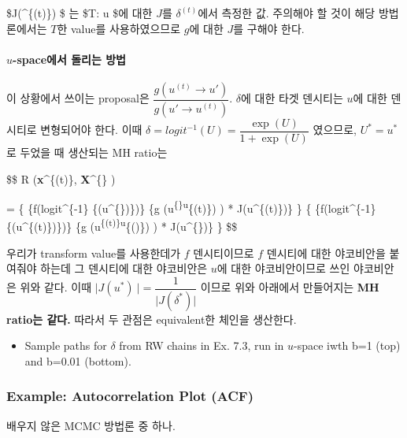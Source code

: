 \documentclass[
]{book}
\providecommand{\tightlist}{%
  \setlength{\itemsep}{0pt}\setlength{\parskip}{0pt}}
\begin{document}
\$\lvert J(\delta\^{}\{(t)\}) \rvert \$ 는 \$T: \delta \rightarrow u \$에 대한 \(J\)를 \(\delta^{(t)}\)에서 측정한 값. 주의해야 할 것이 해당 방법론에서는 \(T\)한 value를 사용하였으므로 \(g\)에 대한 \(J\)를 구해야 한다.

\hypertarget{u-spaceuxc5d0uxc11c-uxb3ccuxb9acuxb294-uxbc29uxbc95}{%
\paragraph{\texorpdfstring{\(u\)-space에서 돌리는 방법}{u-space에서 돌리는 방법}}\label{u-spaceuxc5d0uxc11c-uxb3ccuxb9acuxb294-uxbc29uxbc95}}

이 상황에서 쓰이는 proposal은 \(\dfrac {g(u^{(t)} \rightarrow u')} {g(u' \rightarrow u^{(t)})}\). \(\delta\)에 대한 타겟 덴시티는 \(u\)에 대한 덴시티로 변형되어야 한다. 이때 \(\delta = logit^{-1}(U) = \dfrac{\exp(U)}{1+\exp(U)}\) 였으므로, \(U^{\ast} = u^{\ast}\) 로 두었을 때 생산되는 MH ratio는

\$\$
R (\textbf {x}\^{}\{(t)\}, \textbf X\^{}\{\ast\} )

=\dfrac 
\{\dfrac
\{f(logit\^{}\{-1\} \{(u\^{}\{\ast\})\})\}
\{g \left(u\textsuperscript{\{\ast\}\textbar u}\{(t)\}) \right) * \left\textbar{} J(u\^{}\{(t)\})\right\textbar\}
\}
\{\dfrac
\{f(logit\^{}\{-1\} \{(u\^{}\{(t)\})\})\}
\{g \left(u\textsuperscript{\{(t)\}\textbar u}\{(\ast)\}) \right) * \left\textbar{} J(u\^{}\{\ast\})\right\textbar\}
\}
\$\$

우리가 transform value를 사용한데가 \(f\) 덴시티이므로 \(f\) 덴시티에 대한 야코비안을 붙여줘야 하는데 그 덴시티에 대한 야코비안은 \(u\)에 대한 야코비안이므로 쓰인 야코비안은 위와 같다. 이때 \(\lvert J(u^{\ast})\ \rvert = \dfrac {1} {\lvert J(\delta^{\ast}) \rvert}\) 이므로 위와 아래에서 만들어지는 \textbf{MH ratio는 같다.} 따라서 두 관점은 equivalent한 체인을 생산한다.

\begin{itemize}
\tightlist
\item
  Sample paths for \(\delta\) from RW chains in Ex. 7.3, run in \(u\)-space iwth b=1 (top) and b=0.01 (bottom).
\end{itemize}

\hypertarget{example-autocorrelation-plot-acf}{%
\subsubsection{Example: Autocorrelation Plot (ACF)}\label{example-autocorrelation-plot-acf}}

배우지 않은 MCMC 방법론 중 하나.
\end{document}
